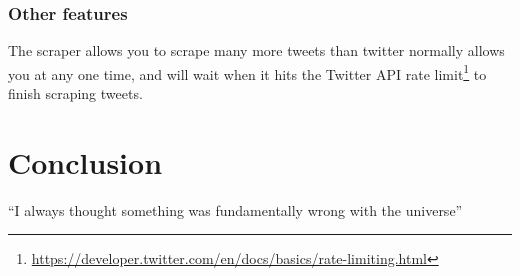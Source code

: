 \documentclass{article}
\begin{document}
\subsubsection{Other features}

The scraper allows you to scrape many more tweets than twitter normally allows you at any one time, and will wait when it hits the Twitter API rate limit\footnote{\url{https://developer.twitter.com/en/docs/basics/rate-limiting.html}} to finish scraping tweets.



\section{Conclusion}
``I always thought something was fundamentally wrong with the universe'' \citep{adams1995hitchhiker}



\end{document}
